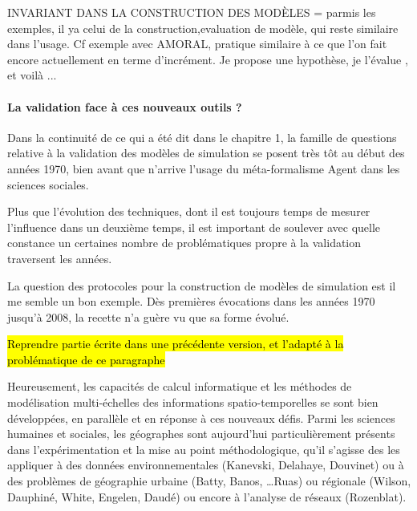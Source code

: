 INVARIANT DANS LA CONSTRUCTION DES MODÈLES = parmis les exemples, il ya celui de la construction,evaluation de modèle, qui reste similaire dans l'usage. Cf exemple avec AMORAL, pratique similaire à ce que l'on fait encore actuellement en terme d'incrément. Je propose une hypothèse, je l'évalue , et voilà ...

\paragraph{La validation face à ces nouveaux outils ?}
\label{p:validation_nouveaux_outils}

Dans la continuité de ce qui a été dit dans le chapitre 1, la famille de questions relative à la validation des modèles de simulation se posent très tôt au début des années 1970, bien avant que n'arrive l'usage du méta-formalisme Agent dans les sciences sociales.

Plus que l'évolution des techniques, dont il est toujours temps de mesurer l'influence dans un deuxième temps, il est important de soulever avec quelle constance un certaines nombre de problématiques propre à la validation traversent les années. 

La question des protocoles pour la construction de modèles de simulation est il me semble un bon exemple. Dès premières évocations dans les années 1970 jusqu'à 2008, la recette n'a guère vu que sa forme évolué.



\hl{Reprendre partie écrite dans une précédente version, et l'adapté à la problématique de ce paragraphe}


Heureusement, les capacités de calcul informatique et les méthodes de modélisation multi-échelles des informations spatio-temporelles se sont bien développées, en parallèle et en réponse à ces nouveaux défis. Parmi les sciences humaines et sociales, les géographes sont aujourd'hui particulièrement présents dans l’expérimentation et la mise au point méthodologique, qu’il s’agisse des les appliquer à des données environnementales (Kanevski, Delahaye, Douvinet) ou à des problèmes de géographie urbaine (Batty, Banos, …Ruas) ou régionale (Wilson, Dauphiné, White, Engelen, Daudé) ou encore à l’analyse de réseaux (Rozenblat). 

